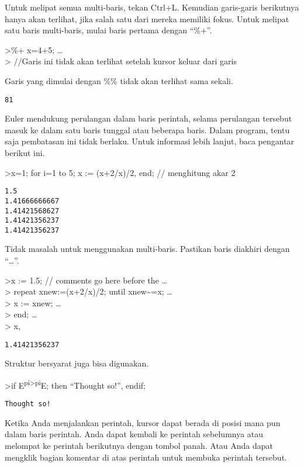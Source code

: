 \documentclass[
]{book}
\begin{document}
Untuk melipat semua multi-baris, tekan Ctrl+L. Kemudian garis-garis berikutnya hanya akan terlihat, jika salah satu dari mereka memiliki fokus. Untuk melipat satu baris multi-baris, mulai baris pertama dengan ``\%+''.

\textgreater\%+ x=4+5; \ldots{}\\
\textgreater{} //Garis ini tidak akan terlihat setelah kursor keluar dari garis

Garis yang dimulai dengan \%\% tidak akan terlihat sama sekali.

\begin{verbatim}
81
\end{verbatim}

Euler mendukung perulangan dalam baris perintah, selama perulangan tersebut masuk ke dalam satu baris tunggal atau beberapa baris. Dalam program, tentu saja pembatasan ini tidak berlaku. Untuk informasi lebih lanjut, baca pengantar berikut ini.

\textgreater x=1; for i=1 to 5; x := (x+2/x)/2, end; // menghitung akar 2

\begin{verbatim}
1.5
1.41666666667
1.41421568627
1.41421356237
1.41421356237
\end{verbatim}

Tidak masalah untuk menggunakan multi-baris. Pastikan baris diakhiri dengan ``\ldots{}''.

\textgreater x := 1.5; // comments go here before the \ldots{}\\
\textgreater{} repeat xnew:=(x+2/x)/2; until xnew\textasciitilde=x; \ldots{}\\
\textgreater{} x := xnew; \ldots{}\\
\textgreater{} end; \ldots{}\\
\textgreater{} x,

\begin{verbatim}
1.41421356237
\end{verbatim}

Struktur bersyarat juga bisa digunakan.

\textgreater if E\textsuperscript{pi\textgreater pi}E; then ``Thought so!'', endif;

\begin{verbatim}
Thought so!
\end{verbatim}

Ketika Anda menjalankan perintah, kursor dapat berada di posisi mana pun dalam baris perintah. Anda dapat kembali ke perintah sebelumnya atau melompat ke perintah berikutnya dengan tombol panah. Atau Anda dapat mengklik bagian komentar di atas perintah untuk membuka perintah tersebut.
\end{document}
